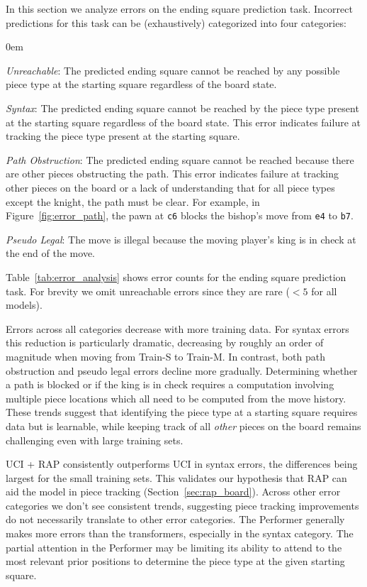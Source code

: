 \documentclass[12pt]{thesis-umich}[thesis]
\newcommand{\pos}[1]{\texttt{#1}}
\newenvironment{itemizesquish}{\begin{list}{\setcounter{enumi}{0}\labelitemi}{\setlength{\itemsep}{-0.25em}\setlength{\labelwidth}{0.5em}\setlength{\leftmargin}{\labelwidth}\addtolength{\leftmargin}{\labelsep}}}{\end{list}}
\begin{document}
In this section we analyze errors on the ending square prediction task. 
Incorrect predictions for this task can be (exhaustively) categorized into four categories:

\begin{itemizesquish}
	\itemsep0em 
	\item {\em Unreachable}: The predicted ending square cannot be reached by any possible piece type at the starting square regardless of the board state. 
	\item {\em Syntax}: The predicted ending square cannot be reached by the piece type present at the starting square regardless of the board state. This error indicates failure at tracking the piece type present at the starting square. 
	\item {\em Path Obstruction}: The predicted ending square cannot be reached 
	because there are other pieces obstructing the path. This error indicates failure at tracking other pieces on the board or a lack of understanding that for all piece types except the knight, the path must be clear. For example, in Figure~\ref{fig:error_path}, the pawn at \pos{c6} blocks the bishop's move from \pos{e4} to \pos{b7}.
	\item {\em Pseudo Legal}: 
	The move is illegal because the moving player's king is in check at the end of the move. 
\end{itemizesquish}
Table~\ref{tab:error_analysis} shows error counts for the ending square prediction task. 
For brevity we omit unreachable errors since they are rare ($< 5$ for all models).


Errors across all categories decrease with more training data. For syntax errors this reduction is particularly dramatic, decreasing by roughly an order of magnitude when moving from Train-S to Train-M. In contrast, both path obstruction and pseudo legal errors decline more gradually.
Determining whether a path is blocked or if the king is in check requires a computation involving multiple piece locations which all need to be computed from the move  history. 
These trends suggest that identifying the piece type at a starting square 
requires data but is learnable, while keeping track of all \emph{other} pieces  on the board remains challenging even with large training sets.

UCI + RAP consistently outperforms UCI in syntax errors, the differences being largest for the small training sets. This validates our hypothesis that RAP can aid the model in piece tracking (Section~\ref{sec:rap_board}). Across other error categories we don't see consistent trends, suggesting piece tracking improvements do not necessarily translate to other error categories. The Performer generally makes more errors than the transformers, especially in the syntax category. The partial attention in the Performer may be limiting its ability to attend to the most relevant prior positions to determine the piece type at the given starting square. 
\end{document}
